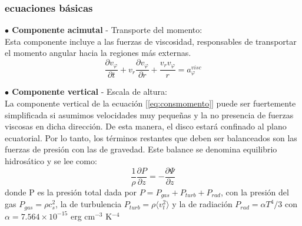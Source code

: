 \documentclass{beamer}
\begin{document}
\begin{frame}
\frametitle{ecuaciones básicas}
\justify
\scriptsize
\textbf{$\bullet$ Componente acimutal} - Transporte del momento:\\
Esta componente incluye a las fuerzas de viscosidad, responsables de transportar el momento angular
hacia la regiones más externas.
\begin{equation}\label{eq:acimutal}
\frac{\partial v_{\varphi}}{\partial t} +v_{r}\frac{\partial v_{\varphi}}{\partial r} +
\frac{v_r v_{\varphi}}{r} = a_{\varphi}^{visc}
\end{equation}

\textbf{$\bullet$ Componente vertical} - Escala de altura:\\

La componente vertical de la ecuación [\ref{eq:consmomento}] puede ser fuertemente
simplificada si asumimos velocidades muy pequeñas y la no presencia de fuerzas viscosas
en dicha dirección. De esta manera, el disco estará confinado al plano ecuatorial. Por 
lo tanto, los términos restantes que deben ser balanceados son las fuerzas de presión 
con las de gravedad. Este balance se denomina equilibrio hidrosático y se lee como:
\begin{equation}\label{eq:vertical}
\frac{1}{\rho}\frac{\partial P}{\partial z} = -\frac{\partial \Psi}{\partial z} 
\end{equation}
donde P es la presión total dada por $P=P_{gas}+P_{turb}+P_{rad}$, con la presión
del gas $P_{gas}=\rho c_s^2$, la de turbulencia $P_{turb}=\rho \langle v_t^2 \rangle$
y la de radiación $P_{rad}=\alpha T^4/3$ con $\alpha=7.564\times10^{-15}$ erg cm$^{-3}$
 K$^{-4}$
\end{frame}
\end{document}
